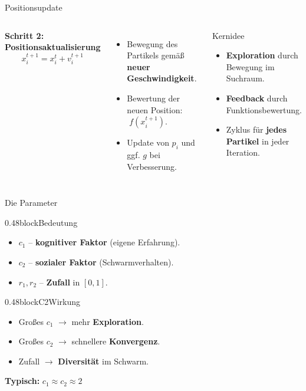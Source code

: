 \begin{frame}{Positionsupdate}
\begin{columns}
\textbf{Schritt 2: Positionsaktualisierung}
\[
\boxed{
x_i^{t+1} = x_i^{t} + v_i^{t+1}
}
\]

\begin{itemize}
\item Bewegung des Partikels gemäß \textbf{neuer Geschwindigkeit}.
\item Bewertung der neuen Position: $\;f(x_i^{t+1})$.
\item Update von \textbf{$p_i$} und ggf. \textbf{$g$} bei Verbesserung.
\end{itemize}

\begin{block}{Kernidee}
\begin{itemize}
\item \textbf{Exploration} durch Bewegung im Suchraum.
\item \textbf{Feedback} durch Funktionsbewertung.
\item Zyklus für \textbf{jedes Partikel} in jeder Iteration.
\end{itemize}
\end{block}

\end{columns}
\end{frame}


\begin{frame}{Die Parameter}
\begin{blockrow}
\begin{blockcol}{0.48\textwidth}{block}{Bedeutung}
\begin{itemize}
\item $c_1$ -- \textbf{kognitiver Faktor} (eigene Erfahrung).
\item $c_2$ -- \textbf{sozialer Faktor} (Schwarmverhalten).
\item $r_1, r_2$ -- \textbf{Zufall} in $[0,1]$.
\end{itemize}
\end{blockcol}

\begin{blockcol}{0.48\textwidth}{blockC2}{Wirkung}
\begin{itemize}
\item Großes $c_1$ $\rightarrow$ mehr \textbf{Exploration}.
\item Großes $c_2$ $\rightarrow$ schnellere \textbf{Konvergenz}.
\item Zufall $\rightarrow$ \textbf{Diversität} im Schwarm.
\end{itemize}

\vspace{0.5em}
\textbf{Typisch:} $c_1 \approx c_2 \approx 2$
\end{blockcol}

\end{blockrow}
\end{frame}

